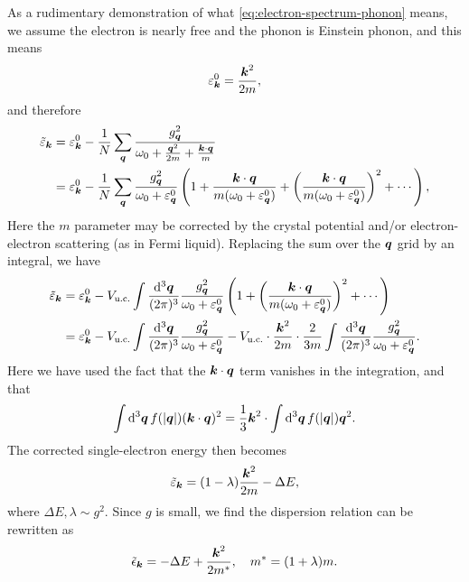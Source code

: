 \documentclass[hyperref, a4paper]{article}
\begin{document}
As a rudimentary demonstration of what \eqref{eq:electron-spectrum-phonon} means, 
we assume the electron is nearly free 
and the phonon is Einstein phonon,
and this means 
\[
    \varepsilon_{\vb*{k}}^0 = \frac{\vb*{k}^2}{2m},
\]
and therefore
\begin{equation}
    \begin{aligned}
        \tilde{\varepsilon}_{\vb*{k}} &= \varepsilon^0_{\vb*{k}} - \frac{1}{N} \sum_{\vb*{q}} \frac{g_{\vb*{q}}^2}{\omega_0 + \frac{\vb*{q}^2}{2m} + \frac{\vb*{k} \cdot \vb*{q}}{m}} \\
        &= \varepsilon^0_{\vb*{k}} - \frac{1}{N} \sum_{\vb*{q}} \frac{g_{\vb*{q}}^2}{\omega_0 + \varepsilon^0_{\vb*{q}}} \left(
            1 + \frac{\vb*{k} \cdot \vb*{q}}{m (\omega_0 + \varepsilon_{\vb*{q}}^0)} + 
            \left(
                \frac{\vb*{k} \cdot \vb*{q}}{m (\omega_0 + \varepsilon_{\vb*{q}}^0)}
            \right)^2 + \cdots
        \right) ,
    \end{aligned}
\end{equation}
Here the $m$ parameter may be corrected by the crystal potential 
and/or electron-electron scattering (as in Fermi liquid).
Replacing the sum over the $\vb*{q}$ grid by an integral, 
we have 
\begin{equation}
    \begin{aligned}
        \tilde{\varepsilon}_{\vb*{k}} &= \varepsilon^0_{\vb*{k}}
        - V_{\text{u.c.}} \int \frac{\dd[3]{\vb*{q}}}{(2\pi)^3} \frac{g_{\vb*{q}}^2}{\omega_0 + \varepsilon^0_{\vb*{q}}} \left(
            1 + 
            \left(
                \frac{\vb*{k} \cdot \vb*{q}}{m (\omega_0 + \varepsilon_{\vb*{q}}^0)}
            \right)^2 + \cdots
        \right) \\
        &= \varepsilon^0_{\vb*{k}} - V_{\text{u.c.}} \int \frac{\dd[3]{\vb*{q}}}{(2\pi)^3} \frac{g_{\vb*{q}}^2}{\omega_0 + \varepsilon^0_{\vb*{q}}} 
        - V_{\text{u.c.}} \cdot \frac{\vb*{k}^2}{2m} \cdot \frac{2}{3m} \int \frac{\dd[3]{\vb*{q}}}{(2\pi)^3} \frac{g_{\vb*{q}}^2 }{\omega_0 + \varepsilon^0_{\vb*{q}}} .
    \end{aligned}
\end{equation}
Here we have used the fact that the $\vb*{k} \cdot \vb*{q}$ term vanishes in the integration, 
and that 
\begin{equation}
    \int \dd[3]{\vb*{q}} f(\abs{\vb*{q}}) (\vb*{k} \cdot \vb*{q})^2 = 
    \frac{1}{3} \vb*{k}^2 \cdot \int \dd[3]{\vb*{q}} f(\abs{\vb*{q}}) \vb*{q}^2.
\end{equation}
The corrected single-electron energy then becomes 
\begin{equation}
    \tilde{\varepsilon}_{\vb*{k}} = (1 - \lambda) \frac{\vb*{k}^2}{2m} - \Delta E,
\end{equation}
where $\Delta E, \lambda \sim g^2$.
Since $g$ is small, we find the dispersion relation can be rewritten as 
\begin{equation}
    \tilde{\epsilon}_{\vb*{k}} = -\Delta E + \frac{\vb*{k}^2}{2 m^*}, \quad m^* = (1 + \lambda) m.
\end{equation}
\end{document}

